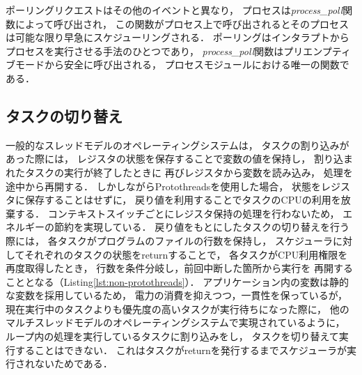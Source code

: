 \vspace{0.5em}ポーリングリクエストはその他のイベントと異なり，
プロセスは{\it process\_poll}関数によって呼び出され，
この関数がプロセス上で呼び出されるとそのプロセスは可能な限り早急にスケジューリングされる．
ポーリングはインタラプトからプロセスを実行させる手法のひとつであり，
{\it process\_poll}関数はプリエンプティブモードから安全に呼び出される，
プロセスモジュールにおける唯一の関数である．








\subsection{タスクの切り替え}\label{sec:change_tasks}
一般的なスレッドモデルのオペレーティングシステムは，
タスクの割り込みがあった際には，
レジスタの状態を保存することで変数の値を保持し，
割り込まれたタスクの実行が終了したときに
再びレジスタから変数を読み込み，
処理を途中から再開する．
しかしながらProtothreadsを使用した場合，
状態をレジスタに保存することはせずに，
戻り値を利用することでタスクのCPUの利用を放棄する．
コンテキストスイッチごとにレジスタ保持の処理を行わないため，
エネルギーの節約を実現している．
戻り値をもとにしたタスクの切り替えを行う際には，
各タスクがプログラムのファイルの行数を保持し，
スケジューラに対してそれぞれのタスクの状態をreturnすることで，
各タスクがCPU利用権限を再度取得したとき，
行数を条件分岐し，前回中断した箇所から実行を
再開することとなる（Listing\ref{lst:non-protothreads}）．
アプリケーション内の変数は静的な変数を採用しているため，
電力の消費を抑えつつ，一貫性を保っているが，
現在実行中のタスクよりも優先度の高いタスクが実行待ちになった際に，
他のマルチスレッドモデルのオペレーティングシステムで実現されているように，
ループ内の処理を実行しているタスクに割り込みをし，
タスクを切り替えて実行することはできない．
これはタスクがreturnを発行するまでスケジューラが実行されないためである．

